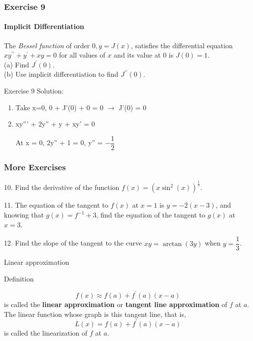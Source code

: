 \begin{frame}
    \frametitle{Exercise 9}
    \framesubtitle{Implicit Differentiation}
    The \textit{Bessel function} of order $0, y=J(x)$, satisfies the differential equation $x y^{\prime \prime}+y^{\prime}+x y=0$ for all values of $x$ and its value at 0 is $J(0)=1$.\\
    (a) Find $J^{\prime}(0)$.\\
    (b) Use implicit differentiation to find $J^{\prime \prime}(0)$.
\end{frame}



\begin{frame}{Exercise 9}
    Solution:
    \begin{enumerate}
        \item Take x=0, 0 + J'(0) + 0 = 0 $\rightarrow$ J'(0) = 0
        \item xy''' + 2y'' + y + xy' = 0

              At x = 0, 2y'' + 1 = 0, y'' = $-\dfrac{1}{2}$
    \end{enumerate}

\end{frame}


\begin{frame}
    \frametitle{More Exercises}
    \begin{block}{10.}
        Find the derivative of the function $\displaystyle f(x)=(x\sin^2(x))^{\frac{1}{3}}$.
    \end{block}

    \begin{block}{11.}
        The equation of the tangent to $f(x)$ at $x=1$ is $y=-2(x-3)$, and knowing that $g(x) = f^{-1}+3$, find the equation of the tangent to $g(x)$ at $x=3$.
    \end{block}

    \begin{block}{12.}
        Find the slope of the tangent to the curve $xy = \arctan(3y)$ when $y = \dfrac{1}{3}$.
    \end{block}

\end{frame}


\begin{frame}{Linear approximation}
    \begin{block}{Definition}

        $$
            f(x) \approx f(a)+f^{\prime}(a)(x-a)
        $$
        is called the \textbf{linear approximation} or \textbf{tangent line approximation} of $f$ at $a$. The linear function whose graph is this tangent line, that is,\\

        $$
            L(x)=f(a)+f^{\prime}(a)(x-a)
        $$
        is called the linearization of $f$ at $a$.
    \end{block}
\end{frame}


